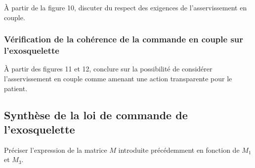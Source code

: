 \documentclass[11pt]{article}
\begin{document}
\UPSTIquestion À partir de la figure 10, discuter du respect des exigences de l'asservissement en couple.
\begin{UPSTIcorrige}

\end{UPSTIcorrige}

\subsubsection{Vérification de la cohérence de la commande en couple sur l’exosquelette}

\UPSTIquestion À partir des figures 11 et 12, conclure sur la possibilité de considérer l'asservissement en couple comme amenant une action transparente pour le patient.
\begin{UPSTIcorrige}

\end{UPSTIcorrige}

\subsection{Synthèse de la loi de commande de l'exosquelette}

\begin{UPSTIcorrige}

\end{UPSTIcorrige}

\UPSTIquestion Préciser l'expression de la matrice $M$ introduite précédemment en fonction de $M_{1}$ et $M_{3}$.
\begin{UPSTIcorrige}

\end{UPSTIcorrige}
\end{document}
